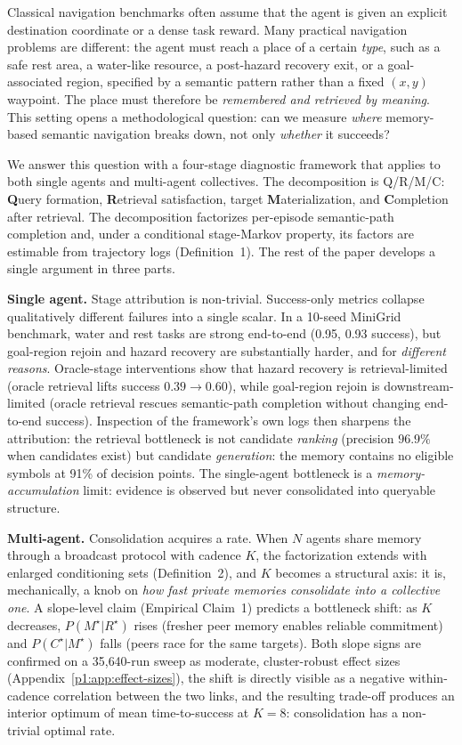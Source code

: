 \documentclass{article}
\begin{document}
Classical navigation benchmarks often assume that the agent is given an
explicit destination coordinate or a dense task reward. Many practical
navigation problems are different: the agent must reach a place of a
certain \emph{type}, such as a safe rest area, a water-like resource, a
post-hazard recovery exit, or a goal-associated region, specified by
a semantic pattern rather than a fixed $(x, y)$ waypoint. The place
must therefore be \emph{remembered and retrieved by meaning}. This
setting opens a methodological question: can we measure \emph{where}
memory-based semantic navigation breaks down, not only \emph{whether}
it succeeds?

We answer this question with a four-stage diagnostic framework that
applies to both single agents and multi-agent collectives. The
decomposition is Q/R/M/C: \textbf{Q}uery formation, \textbf{R}etrieval
satisfaction, target \textbf{M}aterialization, and \textbf{C}ompletion
after retrieval. The decomposition factorizes per-episode semantic-path
completion and, under a conditional stage-Markov property, its factors
are estimable from trajectory logs (Definition~1).
The rest of the paper develops a single argument in three parts.

\textbf{Single agent.} Stage attribution is non-trivial.
Success-only metrics collapse qualitatively different failures into a
single scalar. In a 10-seed MiniGrid benchmark, water and rest tasks
are strong end-to-end (0.95, 0.93 success), but goal-region rejoin and
hazard recovery are substantially harder, and for \emph{different
reasons}. Oracle-stage interventions show that hazard recovery is
retrieval-limited (oracle retrieval lifts success $0.39 \to 0.60$),
while goal-region rejoin is downstream-limited (oracle retrieval
rescues semantic-path completion without changing end-to-end success).
Inspection of the framework's own logs then sharpens the attribution:
the retrieval bottleneck is not candidate \emph{ranking} (precision
$96.9\%$ when candidates exist) but candidate \emph{generation}: the
memory contains no eligible symbols at 91\% of decision points.
The single-agent bottleneck is a \emph{memory-accumulation} limit:
evidence is observed but never consolidated into queryable structure.

\textbf{Multi-agent.} Consolidation acquires a rate.
When $N$ agents share memory through a broadcast protocol with cadence
$K$, the factorization extends with enlarged conditioning sets
(Definition~2), and $K$ becomes a structural axis: it
is, mechanically, a knob on \emph{how fast private memories consolidate
into a collective one}. A slope-level claim
(Empirical Claim~1) predicts a bottleneck shift: as $K$
decreases, $P(M^\star|R^\star)$ rises (fresher peer memory enables
reliable commitment) and $P(C^\star|M^\star)$ falls (peers race for
the same targets). Both slope signs are confirmed on a 35{,}640-run
sweep as moderate, cluster-robust effect sizes (Appendix~\ref{p1:app:effect-sizes}), the shift is directly visible as a negative
within-cadence correlation between the two links, and the resulting
trade-off produces an interior optimum of mean time-to-success at
$K\!=\!8$: consolidation has a non-trivial optimal rate.
\end{document}

